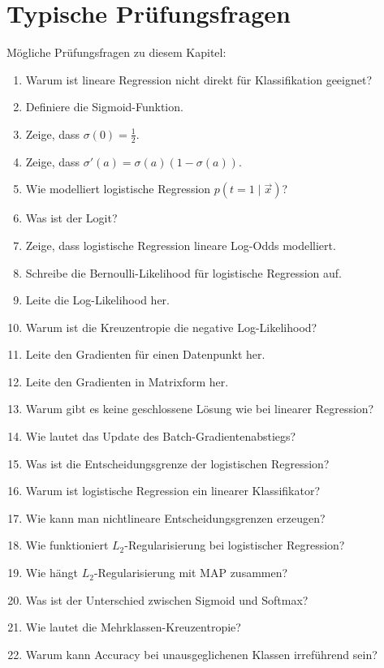 \section{Typische Prüfungsfragen}

\begin{examtipbox}
Mögliche Prüfungsfragen zu diesem Kapitel:

\begin{enumerate}
    \item Warum ist lineare Regression nicht direkt für Klassifikation geeignet?
    \item Definiere die Sigmoid-Funktion.
    \item Zeige, dass \(\sigma(0)=\frac{1}{2}\).
    \item Zeige, dass \(\sigma'(a)=\sigma(a)(1-\sigma(a))\).
    \item Wie modelliert logistische Regression \(p(t=1\mid\vec{x})\)?
    \item Was ist der Logit?
    \item Zeige, dass logistische Regression lineare Log-Odds modelliert.
    \item Schreibe die Bernoulli-Likelihood für logistische Regression auf.
    \item Leite die Log-Likelihood her.
    \item Warum ist die Kreuzentropie die negative Log-Likelihood?
    \item Leite den Gradienten für einen Datenpunkt her.
    \item Leite den Gradienten in Matrixform her.
    \item Warum gibt es keine geschlossene Lösung wie bei linearer Regression?
    \item Wie lautet das Update des Batch-Gradientenabstiegs?
    \item Was ist die Entscheidungsgrenze der logistischen Regression?
    \item Warum ist logistische Regression ein linearer Klassifikator?
    \item Wie kann man nichtlineare Entscheidungsgrenzen erzeugen?
    \item Wie funktioniert \(L_2\)-Regularisierung bei logistischer Regression?
    \item Wie hängt \(L_2\)-Regularisierung mit MAP zusammen?
    \item Was ist der Unterschied zwischen Sigmoid und Softmax?
    \item Wie lautet die Mehrklassen-Kreuzentropie?
    \item Warum kann Accuracy bei unausgeglichenen Klassen irreführend sein?
\end{enumerate}
\end{examtipbox}